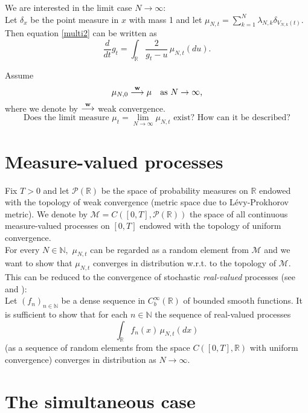 \documentclass[a4paper,twoside,11pt]{article}
\theoremstyle{plain}
\theoremstyle{definition}
\theoremstyle{remark}
\newcommand\R{\mathbb R}         %
\newcommand\N{\mathbb N}         %
\begin{document}
We are interested in the limit case $N\to\infty$:\\

Let $\delta_x$ be the point measure in $x$ with mass 1 and let $\mu_{N,t}=\sum_{k=1}^N \lambda_{N,k} \delta_{V_{N,k}(t)}$. Then equation \eqref{multi2} can be written as 
$$\frac{d}{dt}g_t=\int_{\R}\frac{2}{g_{t}-u}\, \mu_{N,t}(du).$$

Assume \begin{equation}\mu_{N,0} \overset{\bold w}{\longrightarrow} \mu \quad \text{as $N\to\infty$,}\end{equation}
where we denote by $\overset{\bold w}{\longrightarrow}$ weak convergence. \\
$$\text{Does the limit measure $\mu_t = \lim_{N\to\infty}\mu_{N,t}$ exist? How can it be described?}$$
\newpage
\section{Measure-valued processes}

Fix $T>0$ and let $\mathcal{P}(\R)$ be the space of probability measures on $\R$ endowed with the topology of weak convergence
(metric space due to L\'{e}vy-Prokhorov metric). We denote by $\mathcal{M}=C([0,T], \mathcal{P}(\R))$ the space of all continuous measure-valued processes on $[0,T]$ endowed with the topology of uniform convergence.\\
For every $N\in\N,$ $\mu_{N,t}$ can be regarded as a random element from $\mathcal{M}$ and we want to show that $\mu_{N,t}$ converges in distribution w.r.t. to the topology of $\mathcal{M}.$\\
This can be reduced to the convergence of stochastic \emph{real-valued} processes (see \cite{MR1176727, MR1217451, MR1440140} and \cite[p.107ff.]{MR838085}):\\
Let $(f_n)_{n\in\N}$ be a dense sequence in $C^\infty_b(\R)$ of bounded smooth functions. It is sufficient to show that for each $n\in\N$ the sequence of real-valued processes
\begin{equation}\label{eq:dist}
 \int_\R f_n(x) \, \mu_{N,t}(dx)
\end{equation}
(as a sequence of random elements from the space $C([0,T], \R)$ with uniform convergence)
converges in distribution as $N\to\infty.$\\ 


\section{The simultaneous case}
\end{document}
